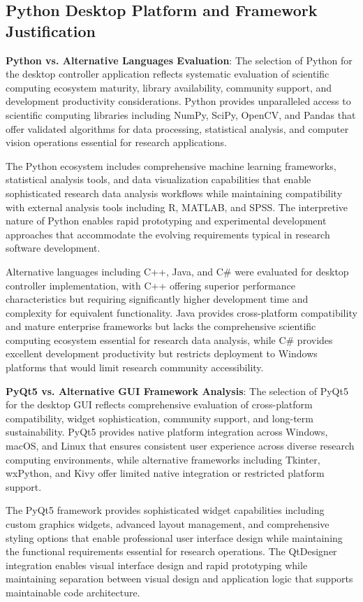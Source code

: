 \documentclass[11pt,a4paper]{report}
\begin{document}
\subsection{Python Desktop Platform and Framework Justification}

\noindent \textbf{Python vs. Alternative Languages Evaluation}: The selection of Python for the desktop controller application reflects systematic evaluation of scientific computing ecosystem maturity, library availability, community support, and development productivity considerations. Python provides unparalleled access to scientific computing libraries including NumPy, SciPy, OpenCV, and Pandas that offer validated algorithms for data processing, statistical analysis, and computer vision operations essential for research applications.

The Python ecosystem includes comprehensive machine learning frameworks, statistical analysis tools, and data visualization capabilities that enable sophisticated research data analysis workflows while maintaining compatibility with external analysis tools including R, MATLAB, and SPSS. The interpretive nature of Python enables rapid prototyping and experimental development approaches that accommodate the evolving requirements typical in research software development.

Alternative languages including C++, Java, and C\# were evaluated for desktop controller implementation, with C++ offering superior performance characteristics but requiring significantly higher development time and complexity for equivalent functionality. Java provides cross-platform compatibility and mature enterprise frameworks but lacks the comprehensive scientific computing ecosystem essential for research data analysis, while C\# provides excellent development productivity but restricts deployment to Windows platforms that would limit research community accessibility.

\noindent \textbf{PyQt5 vs. Alternative GUI Framework Analysis}: The selection of PyQt5 for the desktop GUI reflects comprehensive evaluation of cross-platform compatibility, widget sophistication, community support, and long-term sustainability. PyQt5 provides native platform integration across Windows, macOS, and Linux that ensures consistent user experience across diverse research computing environments, while alternative frameworks including Tkinter, wxPython, and Kivy offer limited native integration or restricted platform support.

The PyQt5 framework provides sophisticated widget capabilities including custom graphics widgets, advanced layout management, and comprehensive styling options that enable professional user interface design while maintaining the functional requirements essential for research operations. The QtDesigner integration enables visual interface design and rapid prototyping while maintaining separation between visual design and application logic that supports maintainable code architecture.
\end{document}
